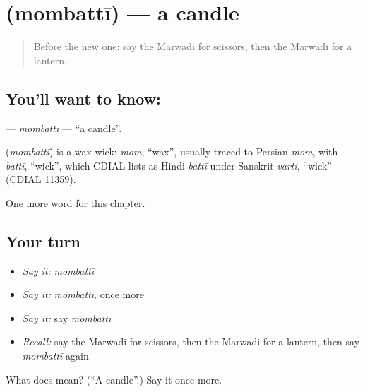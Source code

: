 \section[\texorpdfstring{\mw{मोमबत्ती} (mombattī)}{मोमबत्ती (mombattī)}]{ (mombattī) — a candle}

\label{lesson:MW-C125-mombatti}



\begin{quote}
Before the new one: say the Marwadi for scissors, then the Marwadi for a lantern.
\end{quote}

\subsection*{You'll want to know: }
\textbf{} — \emph{mombattī} — \textquotedblleft{}a candle\textquotedblright{}.

\begin{cousinweb}
\textbf{} (\emph{mombattī}) is a wax wick: \emph{mom}, \textquotedblleft{}wax\textquotedblright{}, usually traced to Persian \emph{mom}, with \emph{battī}, \textquotedblleft{}wick\textquotedblright{}, which CDIAL lists as Hindi \emph{battī} under Sanskrit \emph{varti}, \textquotedblleft{}wick\textquotedblright{} (CDIAL 11359).
\end{cousinweb}

\begin{grammarlens}[title={What you've built}]
One more word for this chapter.
\end{grammarlens}

\subsection*{Your turn}
\begin{itemize}
\raggedright
  \item \emph{Say it:} \emph{mombattī}
  \item \emph{Say it:} \emph{mombattī}, once more
  \item \emph{Say it:} say \emph{mombattī}
  \item \emph{Recall:} say the Marwadi for scissors, then the Marwadi for a lantern, then say \emph{mombattī} again
\end{itemize}

\begin{tcolorbox}[breakable,colback=teal!4,colframe=teal!35!black,title={Before you move on}]
What does  mean? (\textquotedblleft{}A candle\textquotedblright{}.) Say it once more.
\end{tcolorbox}
